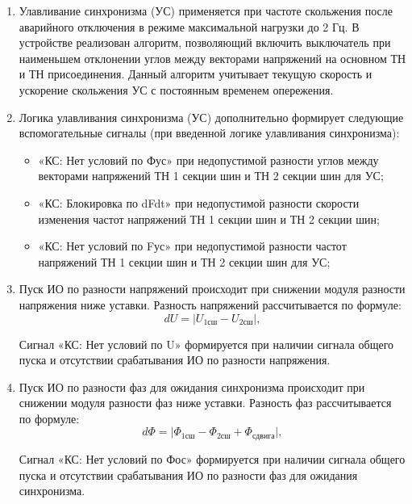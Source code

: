 \begin{enumerate}
\item
Улавливание синхронизма (УС) применяется при частоте скольжения после аварийного отключения в режиме максимальной нагрузки до 2 Гц. В устройстве реализован алгоритм, позволяющий включить
выключатель при наименьшем отклонении углов между векторами напряжений на основном ТН и ТН присоединения. Данный алгоритм учитывает текущую скорость и ускорение скольжения УС с постоянным временем опережения.

\item Логика улавливания синхронизма (УС) дополнительно формирует следующие вспомогательные сигналы (при введенной логике улавливания синхронизма):
\begin{itemize}
    \item «КС: Нет условий по Фус» при недопустимой разности углов между векторами напряжений ТН 1 секции шин и ТН 2 секции шин для УС;
    \item «КС: Блокировка по dFdt»  при недопустимой разности скорости изменения частот напряжений ТН 1 секции шин и ТН 2 секции шин;
    \item «КС: Нет условий по Fус» при недопустимой разности частот напряжений ТН 1 секции шин и ТН 2 секции шин для УС;
\end{itemize}  

\item
Пуск ИО по разности напряжений происходит при снижении модуля разности напряжения ниже уставки. Разность напряжений рассчитывается по формуле:
\begin{equation*}
   dU= \lvert U_{\text{1сш}} -  U_{\text{2сш}}   \rvert,
\end{equation*}
Сигнал «КС: Нет условий по U» формируется при наличии сигнала общего пуска и отсутствии срабатывания ИО по разности напряжения.

\item
Пуск ИО по разности фаз для ожидания синхронизма происходит при снижении модуля разности фаз ниже уставки. Разность фаз рассчитывается по формуле:
\begin{equation*}
   d\Phi= \lvert \Phi_{\text{1сш}} - \Phi_{\text{2сш}} + \Phi_{\text{сдвига}} \rvert ,
\end{equation*}
Сигнал «КС: Нет условий по Фос» формируется при наличии сигнала общего пуска и отсутствии срабатывания ИО по разности фаз для ожидания синхронизма.


\end{enumerate}
